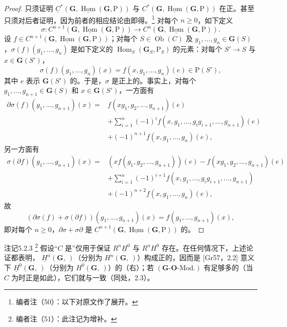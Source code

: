 \begin{proof}
只须证明 $\underline C^*(\mathbf G,\underline{\operatorname{Hom}}(\mathbf G,\mathrm P))$ 与 $C^*(\mathbf G,\underline{\operatorname{Hom}}(\mathbf G,\mathrm P))$ 在正。甚至只须对后者证明，因为前者的相应结论由即得。\footnote{编者注（50）：以下对原文作了展开。} 对每个 $n\geq0$，如下定义
\[
\sigma:C^{n+1}(\mathbf G,\underline{\operatorname{Hom}}(\mathbf G,\mathrm P))\longrightarrow C^n(\mathbf G,\underline{\operatorname{Hom}}(\mathbf G,\mathrm P)).
\]
设 $f\in C^{n+1}(\mathbf G,\underline{\operatorname{Hom}}(\mathbf G,\mathrm P))$；对每个 $S\in\operatorname{Ob}(C)$ 及 $g_1,\ldots,g_n\in\mathbf G(S)$，$\sigma(f)(g_1,\ldots,g_n)$ 是如下定义的 $\operatorname{Hom}_S(\mathbf G_S,\mathrm P_S)$ 的元素：对每个 $S'\to S$ 与 $x\in\mathbf G(S')$，
\[
\sigma(f)(g_1,\ldots,g_n)(x)=f(x,g_1,\ldots,g_n)(e)\in\mathrm P(S'),
\]
其中 $e$ 表示 $\mathbf G(S')$ 的。于是，$\sigma$ 是正上的。事实上，对每个 $g_1,\ldots,g_{n+1}\in\mathbf G(S)$ 和 $x\in\mathbf G(S')$，一方面有
\[
\begin{aligned}
\partial\sigma(f)(g_1,\ldots,g_{n+1})(x)
={}&f(xg_1,g_2,\ldots,g_{n+1})(e)\\
&+\sum_{i=1}^n(-1)^if(x,g_1,\ldots,g_ig_{i+1},\ldots,g_{n+1})(e)\\
&+(-1)^{n+1}f(x,g_1,\ldots,g_n)(e),
\end{aligned}
\]
另一方面有
\[
\begin{aligned}
\sigma(\partial f)(g_1,\ldots,g_{n+1})(x)
={}&(xf(g_1,g_2,\ldots,g_{n+1}))(e)-f(xg_1,g_2,\ldots,g_{n+1})(e)\\
&+\sum_{i=1}^n(-1)^{i+1}f(x,g_1,\ldots,g_ig_{i+1},\ldots,g_{n+1})\\
&+(-1)^{n+2}f(x,g_1,\ldots,g_n)(e),
\end{aligned}
\]
故
\[
(\partial\sigma(f)+\sigma(\partial f))(g_1,\ldots,g_{n+1})(x)=f(g_1,\ldots,g_{n+1})(x),
\]
即对每个 $n\geq0$，$\partial\sigma+\sigma\partial$ 是 $C^{n+1}(\mathbf G,\underline{\operatorname{Hom}}(\mathbf G,\mathrm P))$ 的。
\end{proof}

\begin{SGAresult}{注记}{5.2.3}
\footnote{编者注（51）：此注记为增补。} 假设“$C$ 是”仅用于保证 $R^n\underline H^0$ 与 $R^nH^0$ 存在。在任何情况下，上述论证都表明， $\underline H^n(\mathbf G,\ )$（分别为 $H^n(\mathbf G,\ )$）构成正的，因而是 [Gr57，2.2] 意义下 $\underline H^0(\mathbf G,\ )$（分别为 $H^0(\mathbf G,\ )$）的（右）；若 $(\mathbf G\text{-}\mathbf O\text{-}\mathrm{Mod.})$ 有足够多的（当 $C$ 为时正是如此），它们就与一致（同处，2.3）。
\end{SGAresult}

